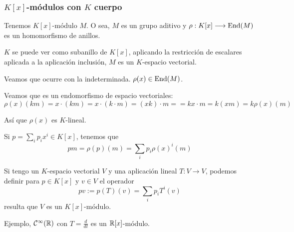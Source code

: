 \subsubsection{\(K[x]\)-módulos con \(K\) cuerpo}

Tenemos \(K[x]\)-módulo \(M\). O sea, \(M\) es un grupo aditivo
y \(\rho: K[x]\longrightarrow\operatorname{End}(M)\) es un homomorfismo de anillos.

\(K\) se puede ver como subanillo de \(K[x]\), aplicando la
restricción de escalares aplicada a la aplicación inclusión,
\(M\) es un \(K\)-espacio vectorial.

Veamos que ocurre con la indeterminada. \(\rho(x)\in\operatorname{End}(M)\).

Veamos que es un endomorfismo de espacio vectoriales:
\[
  \rho(x)(km)=x\cdot (km)=x\cdot(k\cdot m)=(xk)\cdot m=
  =kx\cdot m=k(xm)=k\rho(x)(m)
\]

Así que \(\rho(x)\) es \(K\)-lineal.

Si \(p=\sum_i p_i x^i\in K[x]\), tenemos que
\[
  pm=\rho(p)(m)=\sum_i p_i {\rho(x)}^i(m)
\]

\begin{prop}
  Si tengo un \(K\)-espacio vectorial \(V\) y una aplicación
  lineal \(T:V\longrightarrow V\), podemos definir para \(p\in K[x]\)
  y \(v\in V\) el operador
  \[
    pv:=p(T)(v)=\sum_i p_i T^i(v)
  \]
  resulta que \(V\) es un \(K[x]\)-módulo.
\end{prop}

Ejemplo, \(\mathcal{C}^\infty(\mathbb{R})\) con \(T=\frac{d}{dt}\)
es un \(\mathbb{R}[x]\)-módulo.
